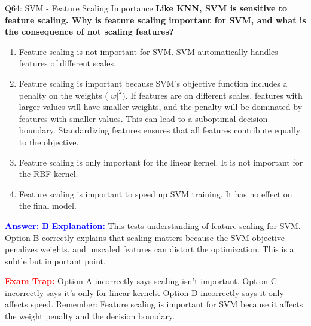 \documentclass[8pt]{beamer}
\begin{document}
	\begin{frame}{Q64: SVM - Feature Scaling Importance}
		\fontsize{6.5}{7.5}\selectfont
		\textbf{Like KNN, SVM is sensitive to feature scaling. Why is feature scaling important for SVM, and what is the consequence of not scaling features?}
		
		\begin{enumerate}
			\item Feature scaling is not important for SVM. SVM automatically handles features of different scales.
			\item Feature scaling is important because SVM's objective function includes a penalty on the weights ($|w|^2$). If features are on different scales, features with larger values will have smaller weights, and the penalty will be dominated by features with smaller values. This can lead to a suboptimal decision boundary. Standardizing features ensures that all features contribute equally to the objective.
			\item Feature scaling is only important for the linear kernel. It is not important for the RBF kernel.
			\item Feature scaling is important to speed up SVM training. It has no effect on the final model.
		\end{enumerate}
		
		\vspace{0.1cm}
		\textcolor{blue}{\textbf{Answer: B}}
		\vspace{0.1cm}
		\textcolor{blue}{\textbf{Explanation:}} This tests understanding of feature scaling for SVM. Option B correctly explains that scaling matters because the SVM objective penalizes weights, and unscaled features can distort the optimization. This is a subtle but important point.
		
		\textcolor{red}{\textbf{Exam Trap:}} Option A incorrectly says scaling isn't important. Option C incorrectly says it's only for linear kernels. Option D incorrectly says it only affects speed. Remember: Feature scaling is important for SVM because it affects the weight penalty and the decision boundary.
	\end{frame}
	
\end{document}
